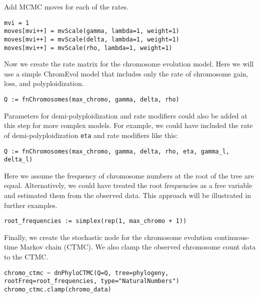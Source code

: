 Add MCMC moves for each of the rates. 
{\tt \begin{snugshade*}
\begin{lstlisting}
mvi = 1
moves[mvi++] = mvScale(gamma, lambda=1, weight=1)
moves[mvi++] = mvScale(delta, lambda=1, weight=1)
moves[mvi++] = mvScale(rho, lambda=1, weight=1)
\end{lstlisting}
\end{snugshade*}}

Now we create the rate matrix for the chromosome evolution model.
Here we will use a simple ChromEvol model that includes
only the rate of chromosome gain, loss, and polyploidization.
{\tt \begin{snugshade*}
\begin{lstlisting}
Q := fnChromosomes(max_chromo, gamma, delta, rho)
\end{lstlisting}
\end{snugshade*}}

Parameters for demi-polyploidization and rate modifiers could also
be added at this step for more complex models. For example, we
could have included the rate of demi-polyploidization \texttt{eta} 
and rate modifiers like this:
{\tt \begin{snugshade*}
\begin{lstlisting}
Q := fnChromosomes(max_chromo, gamma, delta, rho, eta, gamma_l, delta_l)
\end{lstlisting}
\end{snugshade*}}

Here we assume the frequency of chromosome numbers at the root of the tree
are equal. Alternatively, we could have treated the root frequencies
as a free variable and estimated them from the observed data. 
This approach will be illustrated in further examples.
{\tt \begin{snugshade*}
\begin{lstlisting}
root_frequencies := simplex(rep(1, max_chromo + 1))
\end{lstlisting}
\end{snugshade*}}

Finally, we
create the stochastic node for the chromosome evolution continuous-time Markov chain (CTMC).
We also clamp the observed chromosome count data to the CTMC.
{\tt \begin{snugshade*}
\begin{lstlisting}
chromo_ctmc ~ dnPhyloCTMC(Q=Q, tree=phylogeny, rootFreq=root_frequencies, type="NaturalNumbers")
chromo_ctmc.clamp(chromo_data)
\end{lstlisting}
\end{snugshade*}}

